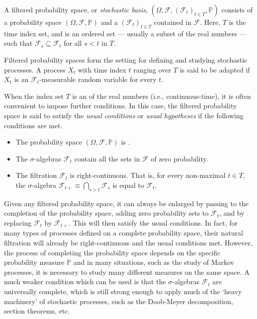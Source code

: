 \documentclass[12pt]{article}
\begin{document}
A filtered probability space, or \emph{stochastic basis}, $(\Omega,\mathcal{F},(\mathcal{F}_t)_{t\in T},\mathbb{P})$ consists of a probability space $(\Omega,\mathcal{F},\mathbb{P})$ and a  $(\mathcal{F}_t)_{t\in T}$ contained in $\mathcal{F}$. Here, $T$ is the time index set, and is an ordered set  --- usually a subset of the real numbers --- such that $\mathcal{F}_s\subseteq\mathcal{F}_t$ for all $s<t$ in $T$.

Filtered probability spaces form the setting for defining and studying stochastic processes. A process $X_t$ with time index $t$ ranging over $T$ is said to be adapted if $X_t$ is an $\mathcal{F}_t$-measurable random variable for every $t$.

When the index set $T$ is an  of the real numbers (i.e., continuous-time), it is often convenient to impose further conditions. In this case, the filtered probability space is said to satisfy the \emph{usual conditions} or \emph{usual hypotheses} if the following conditions are met.
\begin{itemize}
\item The probability space $(\Omega,\mathcal{F},\mathbb{P})$ is .
\item The $\sigma$-algebras $\mathcal{F}_t$ contain all the sets in $\mathcal{F}$ of zero probability.
\item The filtration $\mathcal{F}_t$ is right-continuous. That is, for every non-maximal $t\in T$, the $\sigma$-algebra $\mathcal{F}_{t+}\equiv\bigcap_{s>t}\mathcal{F}_s$ is equal to $\mathcal{F}_t$.
\end{itemize}
Given any filtered probability space, it can always be enlarged by passing to the completion of the probability space, adding zero probability sets to $\mathcal{F}_t$, and by replacing $\mathcal{F}_t$ by $\mathcal{F}_{t+}$. This will then satisfy the usual conditions.
In fact, for many types of processes defined on a complete probability space, their natural filtration will already be right-continuous and the usual conditions met.
However, the process of completing the probability space depends on the specific probability measure $\mathbb{P}$ and in many situations, such as the study of Markov processes, it is necessary to study many different measures on the same space. A much weaker condition which can be used is that the $\sigma$-algebras $\mathcal{F}_t$ are universally complete, which is still strong enough to apply much of the `heavy machinery' of stochastic processes, such as the Doob-Meyer decomposition, section theorems, etc.

\end{document}

